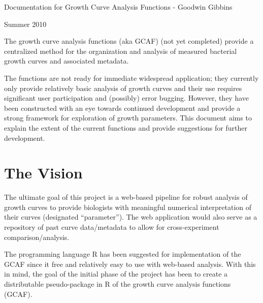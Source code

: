 \documentclass[11pt]{article}
\begin{document}
 \begin{spacing}{.1}
\begin{center} \LARGE{Documentation for Growth Curve Analysis Functions}\small{ - Goodwin Gibbins} \end{center}

\hfill Summer 2010


 
The growth curve analysis functions (aka GCAF) (not yet completed) provide a centralized method for the organization and analysis of measured bacterial growth curves and associated metadata.

The functions are not ready for immediate widespread application; they currently only provide relatively basic analysis of growth curves and their use requires significant user participation and (possibly) error bugging. However, they have been constructed with an eye towards continued development and provide a strong framework for exploration of growth parameters. This document aims to explain the extent of the current functions and provide suggestions for further development.
 
 
\section{The Vision}
 
The ultimate goal of this project is a web-based pipeline for robust analysis of growth curves to provide biologists with meaningful numerical interpretation of their curves (designated ``parameter''). The web application would also serve as a repository of past curve data/metadata to allow for cross-experiment comparison/analysis.
 
The programming language R has been suggested for implementation of the GCAF since it free and relatively easy to use with web-based analysis. With this in mind, the goal of the initial phase of the project has been to create a distributable pseudo-package in R of the growth curve analysis functions (GCAF).
 

\end{spacing}
\end{document}
